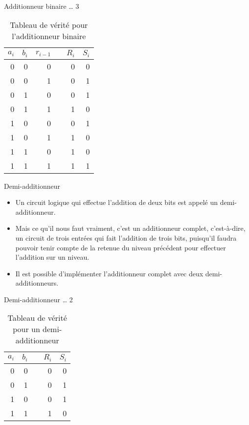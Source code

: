 \documentclass[presentation]{beamer}
\begin{document}
\begin{frame}[label={sec:org9abc3ca}]{Additionneur binaire \ldots{} 3}
\begin{table}[htbp]
\caption{\label{tab:org9afe4fc}Tableau de vérité pour l'additionneur binaire}
\centering
\begin{tabular}{rrrlrr}
\(a_{i}\) & \(b_{i}\) & \(r_{i-1}\) &  & \(R_{i}\) & \(S_{i}\)\\
\hline
0 & 0 & 0 &  & 0 & 0\\
0 & 0 & 1 &  & 0 & 1\\
0 & 1 & 0 &  & 0 & 1\\
0 & 1 & 1 &  & 1 & 0\\
1 & 0 & 0 &  & 0 & 1\\
1 & 0 & 1 &  & 1 & 0\\
1 & 1 & 0 &  & 1 & 0\\
1 & 1 & 1 &  & 1 & 1\\
\end{tabular}
\end{table}
\end{frame}


\begin{frame}[label={sec:org52ba8bd}]{Demi-additionneur}
\begin{itemize}
\item Un circuit logique qui effectue l'addition de deux bits est appelé un demi-additionneur.

\item Mais ce qu'il nous faut vraiment, c'est un \alert{additionneur complet}, c'est-à-dire, un circuit de trois entrées qui fait l’addition de trois bits, puisqu'il faudra pouvoir tenir compte de la retenue du niveau précédent pour effectuer l'addition sur un niveau.

\item Il est possible d'implémenter l'additionneur complet avec deux demi-additionneurs.
\end{itemize}
\end{frame}

\begin{frame}[label={sec:org5263dfa}]{Demi-additionneur \ldots{} 2}
\begin{table}[htbp]
\caption{\label{tab:orgf332910}Tableau de vérité pour un demi-additionneur}
\centering
\begin{tabular}{rrlrr}
\(a_{i}\) & \(b_{i}\) &  & \(R_{i}\) & \(S_{i}\)\\
\hline
0 & 0 &  & 0 & 0\\
0 & 1 &  & 0 & 1\\
1 & 0 &  & 0 & 1\\
1 & 1 &  & 1 & 0\\
\end{tabular}
\end{table}
\end{frame}
\end{document}
